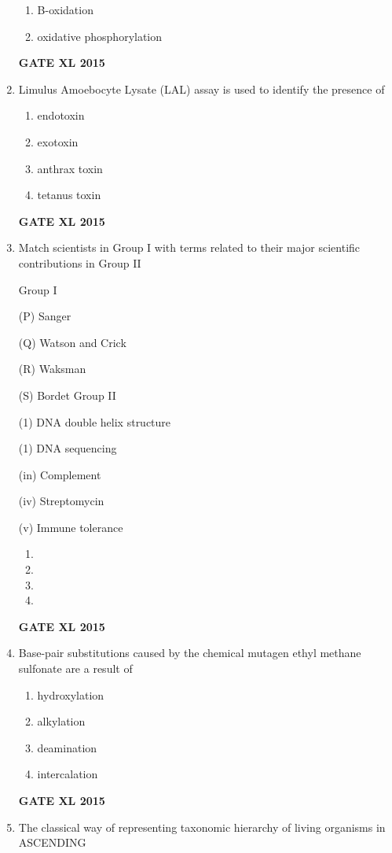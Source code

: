 \documentclass[journal,12pt,onecolumn]{IEEEtran}
\begin{document}
\begin{enumerate}
\begin{enumerate}
	    \item B-oxidation
            \item oxidative phosphorylation
    \end{enumerate}
\begin{flushright}\textbf{GATE XL 2015}\end{flushright}
\item  Limulus Amoebocyte Lysate (LAL) assay is used to identify the presence of
    \begin{enumerate}
            \item endotoxin
	    \item exotoxin
	    \item anthrax toxin
            \item tetanus toxin
    \end{enumerate}
\begin{flushright}\textbf{GATE XL 2015}\end{flushright}
\item Match scientists in Group I with terms related to their major scientific contributions in Group II

Group I

(P) Sanger

(Q) Watson and Crick

(R) Waksman

(S) Bordet
Group II

(1) DNA double helix structure

(1) DNA sequencing

(in) Complement

(iv) Streptomycin

(v) Immune tolerance
    \begin{enumerate}
            \item 
	    \item 
	    \item 
            \item 
    \end{enumerate}
\begin{flushright}\textbf{GATE XL 2015}\end{flushright}
\item Base-pair substitutions caused by the chemical mutagen ethyl methane sulfonate are a result of
    \begin{enumerate}
            \item hydroxylation
	    \item alkylation
	    \item deamination
            \item intercalation
    \end{enumerate}
\begin{flushright}\textbf{GATE XL 2015}\end{flushright}
\item  The classical way of representing taxonomic hierarchy of living organisms in ASCENDING


\end{enumerate}
\end{document}
